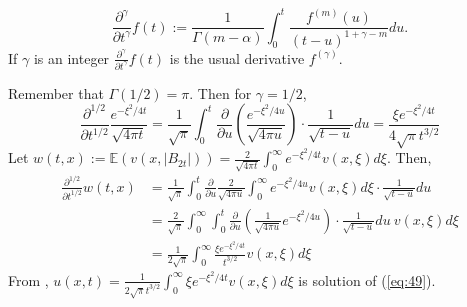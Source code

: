 \documentclass[a4paper, 11pt]{article}
\newcommand{\E}{\mathbb{E}}
\newcommand{\1}{\mathbf{1}}
\begin{document}
\begin{equation*}
\frac{\partial^\gamma}{\partial t^\gamma}f(t):=\frac{1}{\Gamma(m-\alpha)}\int_0^t \frac{f^{(m)}(u)}{(t-u)^{1+\gamma-m}}du.
\end{equation*}
If $\gamma$ is an integer $\frac{\partial^\gamma}{\partial t^\gamma}f(t)$ is the usual derivative $f^{(\gamma)}$.

\medskip

 Remember that $\Gamma(1/2)=\pi$. Then for $\gamma=1/2$,
\begin{equation*}
\frac{\partial^{1/2}}{\partial t^{1/2}}\frac{e^{-\xi^2/4t}}{\sqrt{4\pi t}}=\frac{1}{\sqrt{\pi}}\int_0^t \frac{\partial}{\partial u}\left(\frac{e^{-\xi^2/4u}}{\sqrt{4\pi u}}\right)\cdot \frac{1}{\sqrt{t-u}}du=\frac{\xi e^{-\xi^2/4t}}{4\sqrt{\pi}t^{3/2}}
\end{equation*}
Let $w(t,x):=\E (v(x,|B_{2t}|))=\frac{2}{\sqrt{4\pi t}}\int_0^\infty e^{-\xi^2/4t}v(x,\xi)d\xi$.
Then,
\begin{align*}
\frac{\partial^{1/2}}{\partial t^{1/2}}w(t,x)&=\frac{1}{\sqrt{\pi}}\int_0^t \frac{\partial}{\partial u}\frac{2}{\sqrt{4\pi u}}\int_0^\infty e^{-\xi^2/4u}v(x,\xi)d\xi\cdot \frac{1}{\sqrt{t-u}}du\\
&=\frac{2}{\sqrt{\pi}}\int_0^\infty \int_0^t\frac{\partial}{\partial u}\left(\frac{1}{\sqrt{4\pi u}} e^{-\xi^2/4u}\right)\cdot \frac{1}{\sqrt{t-u}}du\ v(x,\xi)d\xi\\
&=\frac{1}{2\sqrt{\pi}}\int_0^\infty \frac{\xi e^{-\xi^2/4t}}{t^{3/2}} v(x,\xi)d\xi
\end{align*}
From \cite{bragg}, $u(x,t)=\frac{1}{2\sqrt{\pi}t^{3/2}}\int_0^\infty\xi e^{-\xi^2/4t}v(x,\xi)d\xi$
is solution of (\ref{eq:49}).\hfill \framebox[0.6em]{}
\end{document}
